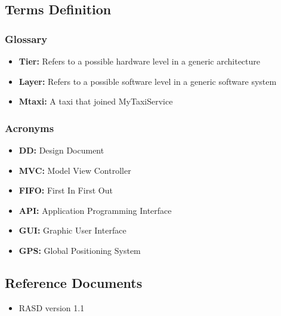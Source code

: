 \documentclass[11pt,titlepage]{article} %
\begin{document}
\subsection{Terms Definition}
	\subsubsection{Glossary}
		\begin{itemize}
			\item \textbf{Tier:} Refers to a possible hardware level in a generic architecture
	        		\item \textbf{Layer:} Refers to a possible software level in a generic software system
			\item \textbf{Mtaxi:} A taxi that joined MyTaxiService
		\end{itemize}
	\subsubsection{Acronyms}
		\begin{itemize}
		        \item \textbf{DD:} Design Document
		        \item \textbf{MVC:} Model View Controller
		        \item \textbf{FIFO:} First In First Out
		        \item \textbf{API:} Application Programming Interface
		        \item \textbf{GUI:} Graphic User Interface
		        \item \textbf{GPS:} Global Positioning System
		\end{itemize}
		

\subsection{Reference Documents}
	\begin{itemize}
		\item RASD version 1.1
	\end{itemize}
\end{document}
